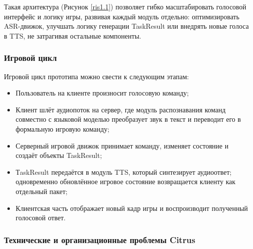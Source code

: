         Такая архитектура (Рисунок \ref{ris1.1}) позволяет гибко масштабировать голосовой интерфейс и логику игры, развивая каждый модуль отдельно: оптимизировать ASR-движок, улучшать логику генерации 
        TaskResult или внедрять новые голоса в TTS, не затрагивая остальные компоненты.

        \subsubsection{Игровой цикл}

        Игровой цикл прототипа можно свести к следующим этапам:

        \begin{itemize}
            \item Пользователь на клиенте произносит голосовую команду;
            \item Клиент шлёт аудиопоток на сервер, где модуль распознавания команд совместно с языковой моделью преобразует звук в текст и переводит его в формальную игровую команду;
            \item Серверный игровой движок принимает команду, изменяет состояние и создаёт объекты TaskResult;
            \item ТaskResult передаётся в модуль TTS, который синтезирует аудиоответ; одновременно обновлённое игровое состояние возвращается клиенту как отдельный пакет;
            \item Клиентская часть отображает новый кадр игры и воспроизводит полученный голосовой ответ.
        \end{itemize}

        
        \subsubsection{Технические и организационные проблемы Citrus}

